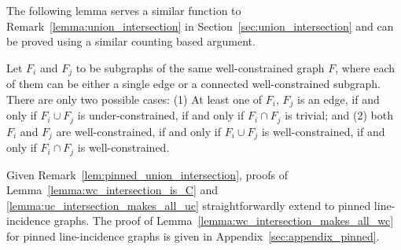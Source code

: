 The following lemma serves a similar function to Remark~\ref{lemma:union_intersection} in Section~\ref{sec:union_intersection}
and can be proved using a similar counting based argument.


\begin{remark}\label{lem:pinned_union_intersection}
Let $F_i$ and $F_j$ to be subgraphs of the same well-constrained graph $F$,
where each of them can be either a single edge or a connected well-constrained subgraph.
There are only two possible cases:
(1) At least one of $F_i$, $F_j$ is an edge, if and only if $F_i \cup F_j$ is under-constrained, if and only if $F_i \cap F_j$ is trivial; and (2) both $F_i$ and $F_j$ are well-constrained, if and only if $F_i \cup F_j$ is well-constrained, if and only if $F_i \cap F_j$ is well-constrained.
\end{remark}

Given Remark~\ref{lem:pinned_union_intersection}, %
proofs of Lemma~\ref{lemma:wc_intersection_is_C} and \ref{lemma:uc_intersection_makes_all_uc} straightforwardly extend to  pinned line-incidence graphs.
The proof of Lemma~\ref{lemma:wc_intersection_makes_all_wc} for pinned
line-incidence graphs is given in Appendix~\ref{sec:appendix_pinned}.

